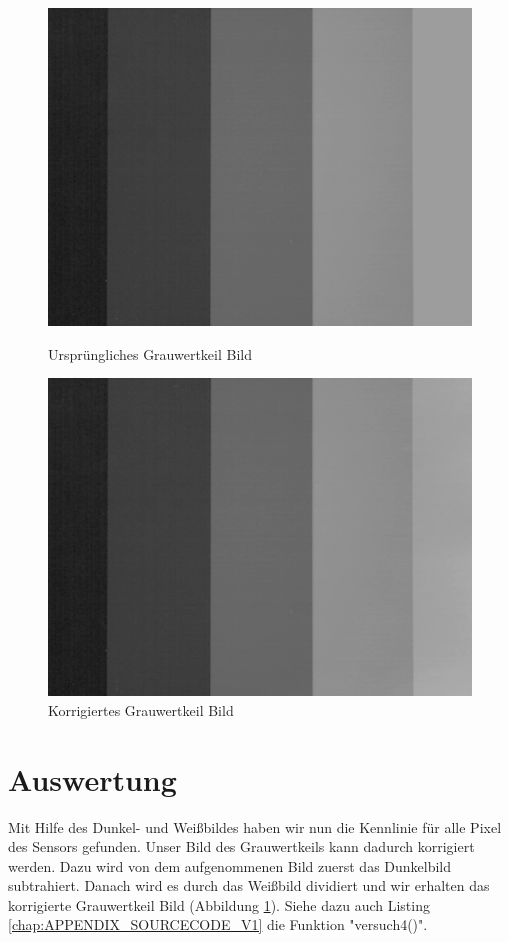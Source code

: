 \documentclass[12pt,oneside,a4paper]{report}
\begin{document}
\begin{figure}
\centering\small
\includegraphics[scale=0.6]{src/Grauwertkeil.png}
\caption{Ursprüngliches Grauwertkeil Bild}
\label{fig:GRAUWERT}
\centering\small
\includegraphics[scale=0.6]{src/KorrigierterGrauwertkeil.png}
\caption{Korrigiertes Grauwertkeil Bild}
\label{fig:GRAUWERT_KOR}
\end{figure}

\section{Auswertung}
\label{chap:VERSUCH_4_AUSWERTUNG}

Mit Hilfe des Dunkel- und Weißbildes haben wir nun die Kennlinie für alle Pixel des Sensors gefunden. Unser Bild des Grauwertkeils kann dadurch korrigiert werden. Dazu wird von dem aufgenommenen Bild zuerst das Dunkelbild subtrahiert. Danach wird es durch das Weißbild dividiert und wir erhalten das korrigierte Grauwertkeil Bild (Abbildung \ref{fig:GRAUWERT_KOR}). Siehe dazu auch Listing \ref{chap:APPENDIX_SOURCECODE_V1} die Funktion "versuch4()".
\end{document}
